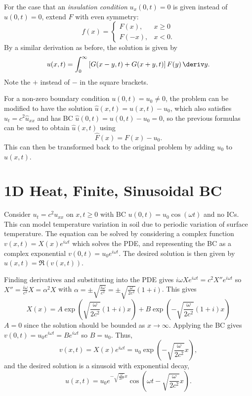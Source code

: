 \documentclass[10pt, a4paper]{article}
\begin{document}
\begin{landscape}
\begin{multicols*}{2}
    For the case that an \emph{insulation condition} \(u_x(0, t) = 0\) is given instead of \(u(0, t) = 0\),
    extend \(F\) with even symmetry:
    \[
        f(x) = \begin{cases}
            F(x), & x \geq 0 \\
            F(-x), & x < 0.
        \end{cases}
    \]
    By a similar derivation as before, the solution is given by
    \[
        u(x, t) = \int_0^{\infty} \left[G(x-y, t) + G(x+y, t)\right] F(y) \,\deriv y.
    \]
    Note the \(+\) instead of \(-\) in the square brackets.

    For a non-zero boundary condition \(u(0, t) = u_0 \neq 0\), the problem can be modified
    to have the solution \(\hat u(x, t) = u(x, t) - u_0\), which also satisfies \(\hat u_t = c^2 \hat u_{xx}\)
    and has BC \(\hat u(0, t) = u(0, t) - u_0 = 0\), so the previous formulas can be used to obtain \(\hat u(x, t)\)
    using
    \[
        \hat F(x) = F(x) - u_0.
    \]
    This can then be transformed back to the original problem by adding \(u_0\) to \(\hat u(x, t)\).

    \section{1D Heat, Finite, Sinusoidal BC}

    Consider \(u_t = c^2 u_{xx}\) on \(x, t \geq 0\) with BC \(u(0, t) = u_0 \cos(\omega t)\) and no ICs.
    This can model temperature variation in soil due to periodic variation of surface temperature.
    The equation can be solved by considering a complex function \(v(x, t) = X(x) e^{i \omega t}\) which solves the PDE,
    and representing the BC as a complex exponential \(v(0, t) = u_0 e^{i \omega t}\).
    The desired solution is then given by \(u(x, t) = \Re(v(x, t))\).

    Finding derivatives and substituting into the PDE gives \(i \omega X e^{i \omega t} = c^2 X'' e^{i \omega t}\)
    so \(X'' = \frac{i \omega}{c^2} X = \alpha^2 X\) with
    \(\alpha = \pm \sqrt{\frac{i \omega}{c^2}} = \pm \sqrt{\frac{\omega}{2c^2}} (1 + i)\).
    This gives
    \[
        X(x) = A \exp\left(\sqrt{\frac{\omega}{2c^2}} (1 + i) x\right)
        + B \exp\left(-\sqrt{\frac{\omega}{2c^2}} (1 + i) x\right)
    \]
    \(A = 0\) since the solution should be bounded as \(x \to \infty\). Applying the BC gives
    \(v(0, t) = u_0 e^{i \omega t} = B e^{i \omega t}\) so \(B = u_0\).
    Thus,
    \[
        v(x, t) = X(x) e^{i \omega t} = u_0 \exp\left(-\sqrt{\frac{\omega}{2c^2}} x\right),
    \]
    and the desired solution is a sinusoid with exponential decay,
    \[
        u(x, t)
        = u_0 e^{-\sqrt{\frac{\omega}{2c^2}} x}
        \cos \left(
            \omega t - \sqrt{\frac{\omega}{2c^2}} x
        \right).
    \]


\end{multicols*}
\end{landscape}
\end{document}
